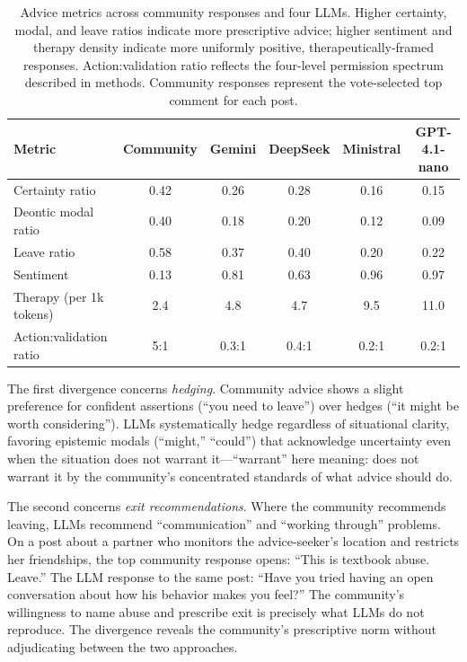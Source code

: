 \begin{table}[t]
\centering
\caption{Advice metrics across community responses and four LLMs. Higher certainty, modal, and leave ratios indicate more prescriptive advice; higher sentiment and therapy density indicate more uniformly positive, therapeutically-framed responses. Action:validation ratio reflects the four-level permission spectrum described in methods. Community responses represent the vote-selected top comment for each post.}
\label{tab:metrics_comparison}
\small
\begin{tabular}{lccccc}
\toprule
\textbf{Metric} & \textbf{Community} & \textbf{Gemini} & \textbf{DeepSeek} & \textbf{Ministral} & \textbf{GPT-4.1-nano} \\
\midrule
Certainty ratio & 0.42 & 0.26 & 0.28 & 0.16 & 0.15 \\
Deontic modal ratio & 0.40 & 0.18 & 0.20 & 0.12 & 0.09 \\
Leave ratio & 0.58 & 0.37 & 0.40 & 0.20 & 0.22 \\
Sentiment & 0.13 & 0.81 & 0.63 & 0.96 & 0.97 \\
Therapy (per 1k tokens) & 2.4 & 4.8 & 4.7 & 9.5 & 11.0 \\
Action:validation ratio & 5:1 & 0.3:1 & 0.4:1 & 0.2:1 & 0.2:1 \\
\bottomrule
\end{tabular}
\end{table}

The first divergence concerns \textit{hedging}. Community advice shows a slight preference for confident assertions (``you need to leave'') over hedges (``it might be worth considering''). LLMs systematically hedge regardless of situational clarity, favoring epistemic modals (``might,'' ``could'') that acknowledge uncertainty even when the situation does not warrant it---``warrant'' here meaning: does not warrant it by the community's concentrated standards of what advice should do.

The second concerns \textit{exit recommendations}. Where the community recommends leaving, LLMs recommend ``communication'' and ``working through'' problems. On a post about a partner who monitors the advice-seeker's location and restricts her friendships, the top community response opens: ``This is textbook abuse. Leave.'' The LLM response to the same post: ``Have you tried having an open conversation about how his behavior makes you feel?'' The community's willingness to name abuse and prescribe exit is precisely what LLMs do not reproduce. The divergence reveals the community's prescriptive norm without adjudicating between the two approaches.

